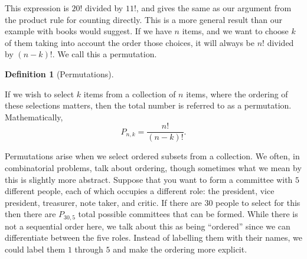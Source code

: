 \documentclass[
  letterpaper,
  DIV=11,
  numbers=noendperiod]{scrreprt}
\theoremstyle{definition}
\newtheorem{definition}{Definition}[chapter]
\theoremstyle{definition}
\theoremstyle{definition}
\theoremstyle{remark}
\begin{document}
This expression is \(20!\) divided by \(11!\), and gives the same as our
argument from the product rule for counting directly. This is a more
general result than our example with books would suggest. If we have
\(n\) items, and we want to choose \(k\) of them taking into account the
order those choices, it will always be \(n!\) divided by \((n-k)!\). We
call this a permutation.

\begin{definition}[Permutations]\protect\hypertarget{def-permutation}{}\label{def-permutation}

If we wish to select \(k\) items from a collection of \(n\) items, where
the ordering of these selections matters, then the total number is
referred to as a permutation. Mathematically,
\[P_{n,k} = \frac{n!}{(n-k)!}.\]

\end{definition}

Permutations arise when we select ordered subsets from a collection. We
often, in combinatorial problems, talk about ordering, though sometimes
what we mean by this is slightly more abstract. Suppose that you want to
form a committee with \(5\) different people, each of which occupies a
different role: the president, vice president, treasurer, note taker,
and critic. If there are \(30\) people to select for this then there are
\(P_{30,5}\) total possible committees that can be formed. While there
is not a sequential order here, we talk about this as being ``ordered''
since we can differentiate between the five roles. Instead of labelling
them with their names, we could label them \(1\) through \(5\) and make
the ordering more explicit.
\end{document}
